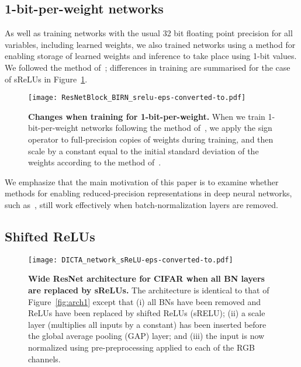 \documentclass[conference]{IEEEtran}
\begin{document}
\subsection{1-bit-per-weight networks}

As well as training networks with the usual 32 bit floating point precision for all variables, including learned weights, we also trained networks using a method for enabling storage of learned weights and inference to take place using 1-bit values. We followed the method of~\cite{McDonnell.18}; differences in training are summarised for the case of sReLUs in Figure~\ref{fig:birn}.

\begin{figure}[h]
\begin{center}
{\texttt{[image: ResNetBlock\_BIRN\_srelu-eps-converted-to.pdf]}}
\end{center}
\caption{{\bf  Changes when training for 1-bit-per-weight.} When we train 1-bit-per-weight networks following the method of~\cite{McDonnell.18}, we apply the sign operator to full-precision copies of weights during training, and then scale by a constant equal to the initial standard deviation of the weights according to the method of~\cite{He.15}.}\label{fig:birn}
\end{figure}

We emphasize that the main motivation of this paper is to examine whether methods for enabling reduced-precision representations in deep neural networks, such as~\cite{McDonnell.18}, still work effectively when batch-normalization layers are removed. 


\subsection{Shifted ReLUs}

\begin{figure*}[ht]
\begin{center}
{\texttt{[image: DICTA\_network\_sReLU-eps-converted-to.pdf]}}
\end{center}
\caption{{\bf  Wide ResNet architecture for CIFAR when all BN layers are replaced by sReLUs.} The architecture is identical to that of Figure~\ref{fig:arch1} except that (i) all BNs have been removed and ReLUs have been replaced by shifted ReLUs (sRELU); (ii) a scale layer (multiplies all inputs by a constant) has been inserted before the global average pooling (GAP) layer; and (iii) the input is now normalized using pre-preprocessing applied to each of the RGB channels.}\label{fig:arch2}
\end{figure*}
\end{document}
